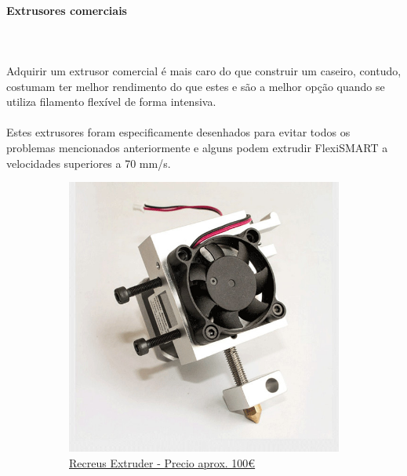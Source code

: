 \documentclass[11pt,a4paper]{article}
\begin{document}
			\paragraph{Extrusores comerciais}\mbox{}\\\\
Adquirir um extrusor comercial é mais caro do que construir um caseiro, contudo, costumam ter melhor rendimento do que estes e são a melhor opção quando se utiliza filamento flexível de forma intensiva.
\\\\
Estes extrusores foram especificamente desenhados para evitar todos os problemas mencionados anteriormente e alguns podem extrudir FlexiSMART a velocidades superiores a 70 mm/s.
\begin{figure}[H]
    \centering
    \begin{subfigure}[b]{0.4\textwidth}
        \includegraphics[width=\textwidth,cfbox=azul_marcos 4pt 0pt]{FOTOS/EXTRUSOR5}
		\caption*{\href{http://www.recreus.com}{{\footnotesize Recreus Extruder - Precio aprox. 100\euro}}}
    \end{subfigure}
    ~ \qquad%
    \begin{subfigure}[b]{0.4\textwidth}

\end{subfigure}
\end{figure}
\end{document}

